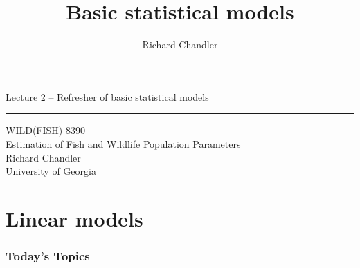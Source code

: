 \documentclass[color=usenames,dvipsnames]{beamer}\usepackage[]{graphicx}\usepackage[]{color}
\title{Basic statistical models}
\author{Richard Chandler}
\begin{document}



\begin{frame}[plain]
  \LARGE
  \centering
  {\huge Lecture 2 -- Refresher of basic statistical models} \\
  {\color{default} \rule{\textwidth}{0.1pt}}
  \vfill
  \large
  WILD(FISH) 8390 \\
  Estimation of Fish and Wildlife Population Parameters \\
  \vfill
  \large
  Richard Chandler \\
  University of Georgia \\
\end{frame}




\section{Linear models}


\begin{frame}[plain]
  \frametitle{Today's Topics}
  \Large
\end{frame}
\end{document}
